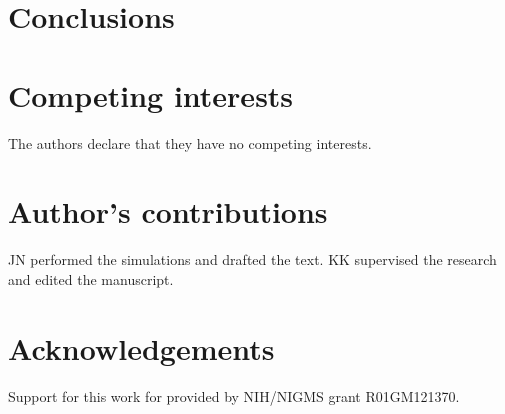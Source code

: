 \documentclass[twocolumn]{bmcart}%
\begin{document}
\section*{Conclusions}




\begin{backmatter}

\section*{Competing interests}
  The authors declare that they have no competing interests.

\section*{Author's contributions}
JN performed the simulations and drafted the text.  KK supervised the research and edited the manuscript.

\section*{Acknowledgements}
Support for this work for provided by NIH/NIGMS grant R01GM121370.
  
  



\end{backmatter}
\end{document}
